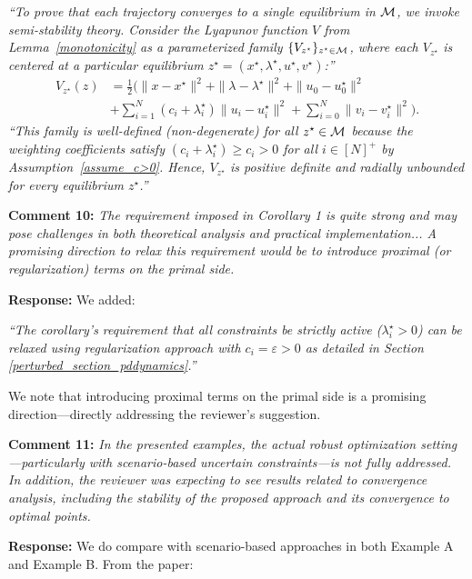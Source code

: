 \documentclass[journal,twoside,web]{ieeecolor}
\begin{document}
{\color{revisionblue}\textit{``To prove that each trajectory converges to a single equilibrium in ${\cal M}$, we invoke semi-stability theory. Consider the Lyapunov function $V$ from Lemma~\ref{monotonicity} as a parameterized family $\{V_{z^\star}\}_{z^\star \in {\cal M}}$, where each $V_{z^\star}$ is centered at a particular equilibrium $z^\star = (x^\star, \lambda^\star, u^\star, v^\star)$:''}}
{\color{revisionblue}
\begin{align*}
V_{z^\star}(z) &= \frac{1}{2}\big( \|x-x^\star\|^2 + \|\lambda-\lambda^\star\|^2 + \|u_0-u_0^\star\|^2 \\&+ \sum_{i=1}^N(c_i+\lambda_i^\star) \|u_i-u_i^\star\|^2+ \sum_{i=0}^N\|v_i-v_i^\star\|^2 \big).
\end{align*}}
{\color{revisionblue}\textit{``This family is well-defined (non-degenerate) for all $z^\star \in {\cal M}$ because the weighting coefficients satisfy $(c_i + \lambda_i^\star) \geq c_i > 0$ for all $i \in [N]^+$ by Assumption~\ref{assume_c>0}. Hence, $V_{z^\star}$ is positive definite and radially unbounded for every equilibrium $z^\star$.''}}

\vspace{0.5em}
\noindent\textbf{Comment 10:} \textit{The requirement imposed in Corollary 1 is quite strong and may pose challenges in both theoretical analysis and practical implementation... A promising direction to relax this requirement would be to introduce proximal (or regularization) terms on the primal side.}

\noindent\textbf{Response:} We added:

{\color{revisionblue}\textit{``The corollary's requirement that all constraints be strictly active ($\lambda_i^\star > 0$) can be relaxed using regularization approach with $c_i = \varepsilon > 0$ as detailed in Section \ref{perturbed_section_pddynamics}.''}}

We note that introducing proximal terms on the primal side is a promising direction---directly addressing the reviewer's suggestion.

\vspace{0.5em}
\noindent\textbf{Comment 11:} \textit{In the presented examples, the actual robust optimization setting---particularly with scenario-based uncertain constraints---is not fully addressed. In addition, the reviewer was expecting to see results related to convergence analysis, including the stability of the proposed approach and its convergence to optimal points.}

\noindent\textbf{Response:} We do compare with scenario-based approaches in both Example A and Example B. From the paper:
\end{document}
